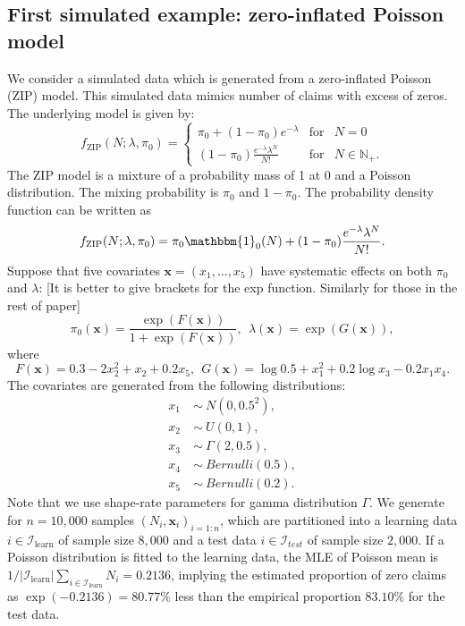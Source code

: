 \documentclass[11pt]{article}
\numberwithin{equation}{section}
\def\N{{\mathbb N}}  %
\def\bx{\boldsymbol{x}}
\begin{document}
\subsection{First simulated example: zero-inflated Poisson model}

We consider a simulated data which is generated from a zero-inflated Poisson (ZIP) model. This simulated data mimics number of claims with excess of zeros.
The underlying  model is given by:
\begin{equation}
	f_{\text{ZIP}}(N;\lambda,\pi_0) = \left\{ 
	\begin{array}{ccl}
		\pi_0+(1-\pi_0)e^{-\lambda} & \mbox{for}
		& N=0 \\
		(1-\pi_0)\frac{e^{-\lambda}\lambda^N}{N!} & \mbox{for} &N\in\N_+.
	\end{array}\right.
\end{equation}
The ZIP model is a mixture of a probability mass of 1 at 0 and a Poisson distribution. The mixing probability is $\pi_0$ and $1-\pi_0$.
The probability density function can be written as
$$f_\text{ZIP}(N;\lambda,\pi_0)= \pi_0\mathbbm{1}_{0}(N) + 
(1-\pi_0)\frac{e^{-\lambda}\lambda^N}{N!}.$$
Suppose that five covariates $\bx=(x_1,\ldots,x_5)$ have systematic effects on both $\pi_0$ and $\lambda$: {\color{blue}[It is better to give brackets for the exp function. Similarly for those in the rest of paper]}
\begin{equation}
	\pi_0(\bx)=\frac{\exp \left(F(\bx)\right)}{1+\exp\left( F(\bx)\right)}, ~~
	\lambda(\bx)=\exp\left( G(\bx)\right), 
\end{equation}
where
\begin{equation}
	F(\bx)=0.3-2x_2^2+x_2+0.2x_5, ~~G(\bx)=\log 0.5+x_1^2 + 0.2\log x_3 - 0.2x_1 x_4.
\end{equation}
The covariates are generated from the following distributions:
\begin{align*}
	x_1~&\sim~N(0,0.5^2),\\
	x_2~&\sim~U(0,1), \\
	x_3~&\sim~\Gamma(2,0.5), \\
	x_4~&\sim~Bernulli(0.5),\\
	x_5~&\sim~Bernulli(0.2).
\end{align*}
Note that we use shape-rate parameters for gamma distribution $\Gamma$.
We generate for $n=10,000$ samples $(N_i,\bx_i)_{i=1:n}$, which are partitioned into a learning data $i\in\mathcal{I}_\text{learn}$ of sample size $8,000$ and a test data $i\in\mathcal{I}_{test}$ of sample size $2,000$. 
If a Poisson distribution is fitted to the learning data, the MLE of Poisson mean is $1/|\mathcal{I}_\text{learn}|\sum_{i\in\mathcal{I}_\text{learn}}N_i=0.2136$, implying the estimated proportion of zero claims as $\exp(-0.2136)=80.77\%$ less than the empirical proportion $83.10\%$ for the test data. 
\end{document}
